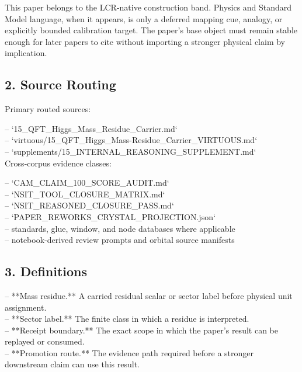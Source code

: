 \documentclass[11pt]{article}
\begin{document}
This paper belongs to the LCR-native construction band. Physics and Standard Model language, when it appears, is only a deferred mapping cue, analogy, or explicitly bounded calibration target. The paper's base object must remain stable enough for later papers to cite without importing a stronger physical claim by implication.

\subsection*{2. Source Routing}

Primary routed sources:

\noindent{}-- `15\_QFT\_Higgs\_Mass\_Residue\_Carrier.md`\\
\noindent{}-- `virtuous/15\_QFT\_Higgs\_Mass-Residue\_Carrier\_VIRTUOUS.md`\\
\noindent{}-- `supplements/15\_INTERNAL\_REASONING\_SUPPLEMENT.md`\\

Cross-corpus evidence classes:

\noindent{}-- `CAM\_CLAIM\_100\_SCORE\_AUDIT.md`\\
\noindent{}-- `NSIT\_TOOL\_CLOSURE\_MATRIX.md`\\
\noindent{}-- `NSIT\_REASONED\_CLOSURE\_PASS.md`\\
\noindent{}-- `PAPER\_REWORKS\_CRYSTAL\_PROJECTION.json`\\
\noindent{}-- standards, glue, window, and node databases where applicable\\
\noindent{}-- notebook-derived review prompts and orbital source manifests\\

\subsection*{3. Definitions}

\noindent{}-- **Mass residue.** A carried residual scalar or sector label before physical unit assignment.\\
\noindent{}-- **Sector label.** The finite class in which a residue is interpreted.\\
\noindent{}-- **Receipt boundary.** The exact scope in which the paper's result can be replayed or consumed.\\
\noindent{}-- **Promotion route.** The evidence path required before a stronger downstream claim can use this result.\\
\end{document}
